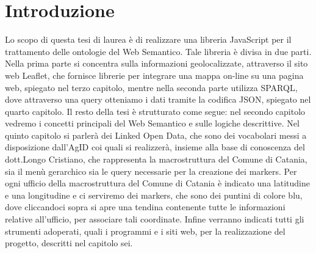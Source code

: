 \documentclass[a4paper,11pt]{article}
\begin{document}
\section{Introduzione}
Lo scopo di questa tesi di laurea è di realizzare una libreria JavaScript per il trattamento delle ontologie del Web Semantico.
Tale libreria è divisa in due parti. Nella prima parte si concentra sulla informazioni geolocalizzate, attraverso il sito web Leaflet, che fornisce librerie per integrare una mappa on-line su una pagina web, spiegato nel terzo capitolo, mentre nella seconda parte utilizza SPARQL, dove attraverso una query otteniamo i dati tramite la codifica JSON, spiegato nel quarto capitolo. 
Il resto della tesi è strutturato come segue: nel secondo capitolo vedremo i concetti principali del Web Semantico e sulle logiche descrittive. Nel quinto capitolo si parlerà  dei Linked Open Data, che sono dei vocabolari messi a disposizione dall'AgID coi quali si realizzerà, insieme alla base di conoscenza del dott.Longo Cristiano, che rappresenta la macrostruttura del Comune di Catania, sia il menù gerarchico sia le query necessarie per la creazione dei markers.
 Per ogni ufficio della macrostruttura del Comune di Catania è indicato una latitudine e una longitudine e ci serviremo dei markers, che sono dei puntini di colore blu, dove cliccandoci sopra si apre una tendina contenente tutte le informazioni relative all'ufficio, per associare tali coordinate. 
Infine verranno indicati tutti gli strumenti adoperati, quali i programmi e i siti web, per la realizzazione del progetto, descritti nel capitolo sei. 



\newpage
\end{document}

